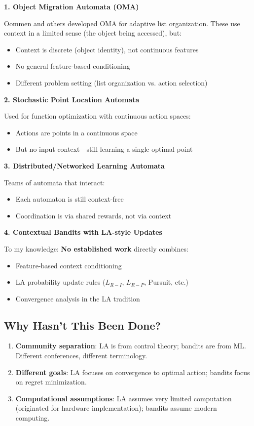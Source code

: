 \documentclass[11pt]{article}
\begin{document}
\textbf{1. Object Migration Automata (OMA)}

Oommen and others developed OMA for adaptive list organization. These use context in a limited sense (the object being accessed), but:
\begin{itemize}
  \item Context is discrete (object identity), not continuous features
  \item No general feature-based conditioning
  \item Different problem setting (list organization vs. action selection)
\end{itemize}

\textbf{2. Stochastic Point Location Automata}

Used for function optimization with continuous action spaces:
\begin{itemize}
  \item Actions are points in a continuous space
  \item But no input context---still learning a single optimal point
\end{itemize}

\textbf{3. Distributed/Networked Learning Automata}

Teams of automata that interact:
\begin{itemize}
  \item Each automaton is still context-free
  \item Coordination is via shared rewards, not via context
\end{itemize}

\textbf{4. Contextual Bandits with LA-style Updates}

To my knowledge: \textbf{No established work} directly combines:
\begin{itemize}
  \item Feature-based context conditioning
  \item LA probability update rules ($L_{R-I}$, $L_{R-P}$, Pursuit, etc.)
  \item Convergence analysis in the LA tradition
\end{itemize}

\subsection{Why Hasn't This Been Done?}

\begin{enumerate}
  \item \textbf{Community separation}: LA is from control theory; bandits are from ML. Different conferences, different terminology.
  \item \textbf{Different goals}: LA focuses on convergence to optimal action; bandits focus on regret minimization.
  \item \textbf{Computational assumptions}: LA assumes very limited computation (originated for hardware implementation); bandits assume modern computing.
\end{enumerate}
\end{document}
